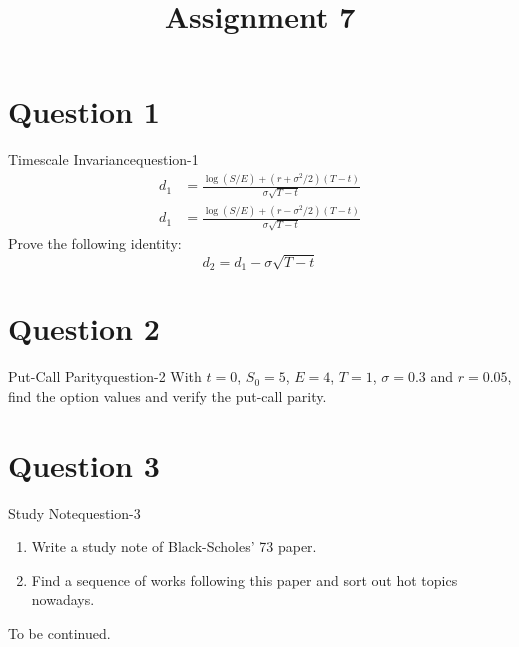 \title{Assignment 7}


\section{Question 1}
\begin{statebox}{Timescale Invariance}{question-1}
    \begin{align*}
        d_1 &= \frac{\log(S/E)+(r+\sigma^2/2)(T-t)}{\sigma\sqrt{T-t}} \\
        d_1 &= \frac{\log(S/E)+(r-\sigma^2/2)(T-t)}{\sigma\sqrt{T-t}}
    \end{align*}
    Prove the following identity:
    \[
    	d_2 = d_1 - \sigma\sqrt{T-t}
    \]
\end{statebox}




\section{Question 2}
\begin{statebox}{Put-Call Parity}{question-2}
    With $t=0$, $S_0=5$, $E=4$, $T=1$, $\sigma=0.3$ and $r=0.05$, find the option values and verify the put-call parity.
\end{statebox}




\section{Question 3}
\begin{statebox}{Study Note}{question-3}
    \begin{enumerate}
    	\item Write a study note of Black-Scholes' 73 paper.
    	\item Find a sequence of works following this paper and sort out hot topics nowadays.
    \end{enumerate}
\end{statebox}

To be continued.
